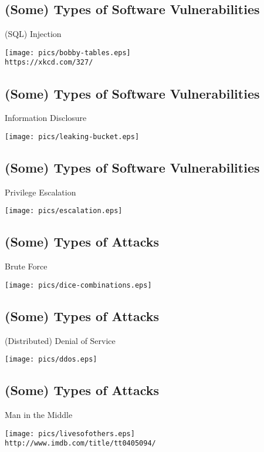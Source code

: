 \documentclass[xga]{xdvislides}
\begin{document}
\subsection{(Some) Types of Software Vulnerabilities}
(SQL) Injection
\begin{center}
	\texttt{[image: pics/bobby-tables.eps]} \\
	\verb+https://xkcd.com/327/+
\end{center}

\subsection{(Some) Types of Software Vulnerabilities}
Information Disclosure
\begin{center}
	\texttt{[image: pics/leaking-bucket.eps]}
\end{center}

\subsection{(Some) Types of Software Vulnerabilities}
Privilege Escalation
\begin{center}
	\texttt{[image: pics/escalation.eps]}
\end{center}

\subsection{(Some) Types of Attacks}
Brute Force
\begin{center}
	\texttt{[image: pics/dice-combinations.eps]} \\
\end{center}

\subsection{(Some) Types of Attacks}
(Distributed) Denial of Service
\begin{center}
	\texttt{[image: pics/ddos.eps]}
\end{center}

\subsection{(Some) Types of Attacks}
Man in the Middle

\begin{center}
	\texttt{[image: pics/livesofothers.eps]} \\
	{\tt http://www.imdb.com/title/tt0405094/}
\end{center}
\end{document}
